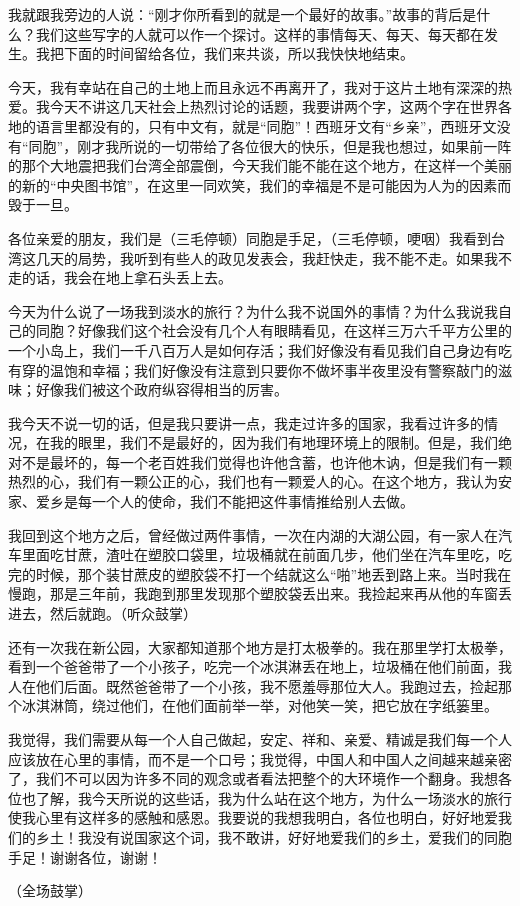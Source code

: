 \par 我就跟我旁边的人说：“刚才你所看到的就是一个最好的故事。”故事的背后是什么？我们这些写字的人就可以作一个探讨。这样的事情每天、每天、每天都在发生。我把下面的时间留给各位，我们来共谈，所以我快快地结束。
\par 今天，我有幸站在自己的土地上而且永远不再离开了，我对于这片土地有深深的热爱。我今天不讲这几天社会上热烈讨论的话题，我要讲两个字，这两个字在世界各地的语言里都没有的，只有中文有，就是“同胞”！西班牙文有“乡亲”，西班牙文没有“同胞”，刚才我所说的一切带给了各位很大的快乐，但是我也想过，如果前一阵的那个大地震把我们台湾全部震倒，今天我们能不能在这个地方，在这样一个美丽的新的“中央图书馆”，在这里一同欢笑，我们的幸福是不是可能因为人为的因素而毁于一旦。
\par 各位亲爱的朋友，我们是（三毛停顿）同胞是手足，（三毛停顿，哽咽）我看到台湾这几天的局势，我听到有些人的政见发表会，我赶快走，我不能不走。如果我不走的话，我会在地上拿石头丢上去。
\par 今天为什么说了一场我到淡水的旅行？为什么我不说国外的事情？为什么我说我自己的同胞？好像我们这个社会没有几个人有眼睛看见，在这样三万六千平方公里的一个小岛上，我们一千八百万人是如何存活；我们好像没有看见我们自己身边有吃有穿的温饱和幸福；我们好像没有注意到只要你不做坏事半夜里没有警察敲门的滋味；好像我们被这个政府纵容得相当的厉害。
\par 我今天不说一切的话，但是我只要讲一点，我走过许多的国家，我看过许多的情况，在我的眼里，我们不是最好的，因为我们有地理环境上的限制。但是，我们绝对不是最坏的，每一个老百姓我们觉得也许他含蓄，也许他木讷，但是我们有一颗热烈的心，我们有一颗公正的心，我们也有一颗爱人的心。在这个地方，我认为安家、爱乡是每一个人的使命，我们不能把这件事情推给别人去做。
\par 我回到这个地方之后，曾经做过两件事情，一次在内湖的大湖公园，有一家人在汽车里面吃甘蔗，渣吐在塑胶口袋里，垃圾桶就在前面几步，他们坐在汽车里吃，吃完的时候，那个装甘蔗皮的塑胶袋不打一个结就这么“啪”地丢到路上来。当时我在慢跑，那是三年前，我跑到那里发现那个塑胶袋丢出来。我捡起来再从他的车窗丢进去，然后就跑。（听众鼓掌）
\par 还有一次我在新公园，大家都知道那个地方是打太极拳的。我在那里学打太极拳，看到一个爸爸带了一个小孩子，吃完一个冰淇淋丢在地上，垃圾桶在他们前面，我人在他们后面。既然爸爸带了一个小孩，我不愿羞辱那位大人。我跑过去，捡起那个冰淇淋筒，绕过他们，在他们面前举一举，对他笑一笑，把它放在字纸篓里。
\par 我觉得，我们需要从每一个人自己做起，安定、祥和、亲爱、精诚是我们每一个人应该放在心里的事情，而不是一个口号；我觉得，中国人和中国人之间越来越亲密了，我们不可以因为许多不同的观念或者看法把整个的大环境作一个翻身。我想各位也了解，我今天所说的这些话，我为什么站在这个地方，为什么一场淡水的旅行使我心里有这样多的感触和感恩。我要说的我想我明白，各位也明白，好好地爱我们的乡土！我没有说国家这个词，我不敢讲，好好地爱我们的乡土，爱我们的同胞手足！谢谢各位，谢谢！
\par （全场鼓掌）



